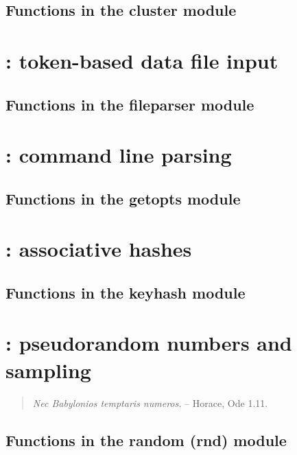 \documentclass[10pt]{book}
\begin{document}
\subsection{Functions in the cluster module}


\newpage
\section{: token-based data file input}

\subsection{Functions in the fileparser module}


\newpage
\section{: command line parsing}

\subsection{Functions in the getopts module}


\newpage
\section{: associative hashes}

\subsection{Functions in the keyhash module}


\newpage
\section{: pseudorandom numbers and sampling}
\begin{quote}
\emph{Nec Babylonios temptaris numeros.} \hspace{3em} -- Horace, Ode
1.11. \\ 
\end{quote}     

\subsection{Functions in the random (rnd) module}

\vspace*{\fill}
\end{document}
